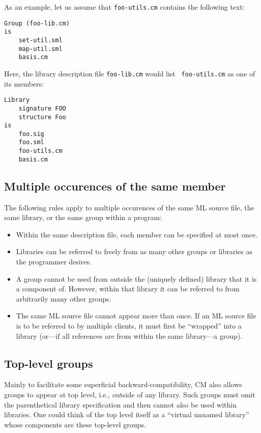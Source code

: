 \documentclass{article}
\begin{document}
As an example, let us assume that {\tt foo-utils.cm} contains the
following text:

\begin{verbatim}
Group (foo-lib.cm)
is
    set-util.sml
    map-util.sml
    basis.cm
\end{verbatim}

Here, the library description file {\tt foo-lib.cm} would list {\tt
foo-utils.cm} as one of its members:

\begin{verbatim}
Library
    signature FOO
    structure Foo
is
    foo.sig
    foo.sml
    foo-utils.cm
    basis.cm
\end{verbatim}

\subsection{Multiple occurences of the same member}

The following rules apply to multiple occurences of the same ML source
file, the same library, or the same group within a program:

\begin{itemize}
\item Within the same description file, each member can be specified
at most once.
\item Libraries can be referred to freely from as many other groups or
libraries as the programmer desires.
\item A group cannot be used from outside the (uniquely defined)
library that it is a component of.  However, within that library it
can be referred to from arbitrarily many other groups.
\item The same ML source file cannot appear more than once.  If an ML
source file is to be referred to by multiple clients, it must first be
``wrapped'' into a library (or---if all references are from within the
same library---a group).
\end{itemize}

\subsection{Top-level groups}

Mainly to facilitate some superficial backward-compatibility, CM also
allows groups to appear at top level, i.e., outside of any library.
Such groups must omit the parenthetical library specification and then
cannot also be used within libraries. One could think of the top level
itself as a ``virtual unnamed library'' whose components are these
top-level groups.
\end{document}
